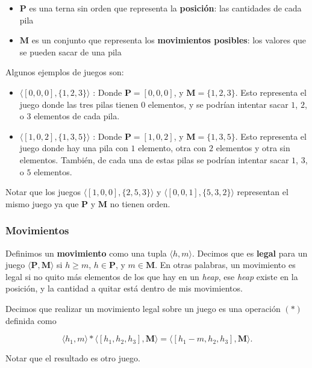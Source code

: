 \documentclass{article}
\newcommand{\nimTuple}[2]{\langle #1, #2\rangle}
\newcommand{\trio}[3]{[#1, #2, #3]}
\newcommand{\movesSet}[3]{\{#1, #2, #3\}}
\newcommand{\pos}{\mathbf{P}}
\newcommand{\moves}{\mathbf{M}}
\begin{document}
\begin{itemize}
    \item $\pos$ es una terna sin orden que representa la \textbf{posición}: las cantidades de cada pila
    \item $\moves$ es un conjunto que representa los \textbf{movimientos posibles}: los valores que se pueden sacar de una pila
\end{itemize}

Algunos ejemplos de juegos son:

\begin{itemize}
    \item $\nimTuple{\trio{0}{0}{0}}{\movesSet{1}{2}{3}}$ : Donde $\pos=\trio{0}{0}{0}$, y $\moves= \movesSet{1}{2}{3}$. Esto representa el juego donde las tres pilas tienen $0$ elementos, y se podrían intentar sacar $1$, $2$, o $3$ elementos de cada pila.
    \item $\nimTuple{\trio{1}{0}{2}}{\movesSet{1}{3}{5}}$ : Donde $\pos=\trio{1}{0}{2}$, y $\moves= \movesSet{1}{3}{5}$. Esto representa el juego donde hay una pila con $1$ elemento, otra con $2$ elementos y otra sin elementos. También, de cada una de estas pilas se podrían intentar sacar $1$, $3$, o $5$ elementos.
\end{itemize}

Notar que los juegos $\nimTuple{\trio{1}{0}{0}}{\movesSet{2}{5}{3}}$ y $\nimTuple{\trio{0}{0}{1}}{\movesSet{5}{3}{2}}$ representan el mismo juego ya que $\pos$ y $\moves$ no tienen orden.

\subsubsection*{Movimientos}

Definimos un \textbf{movimiento} como una tupla $\nimTuple{h}{m}$. Decimos que es \textbf{legal} para un juego $\nimTuple{\pos}{\moves}$ si $h \geq m$, $h \in \pos$, y $m \in \moves$. En otras palabras, un movimiento es legal si no quito más elementos de los que hay en un \textit{heap}, ese \textit{heap} existe en la posición, y la cantidad a quitar está dentro de mis movimientos.

Decimos que realizar un movimiento legal sobre un juego es una operación $(\ast)$ definida como

\[
    \nimTuple{h_1}{m} \ast \nimTuple{\trio{h_1}{h_2}{h_3}}{\moves} = \nimTuple{\trio{h_1 - m}{h_2}{h_3}}{\moves}.
\]

Notar que el resultado es otro juego.
\end{document}
